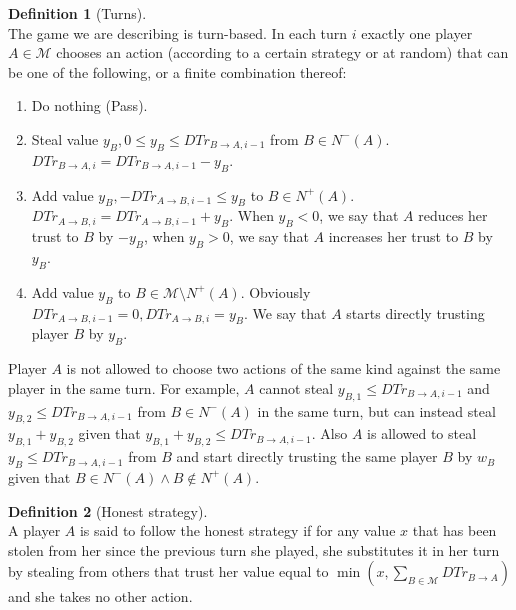 \documentclass[11pt]{article}
\theoremstyle{definition}
\newtheorem{definition}{Definition}[section]
\theoremstyle{corollary}
\begin{document}
      \begin{definition}[Turns] \ \\
         The game we are describing is turn-based. In each turn $i$ exactly one player $A \in \mathcal{M}$ chooses
         an action (according to a certain strategy or at random) that can be one of the following, or a finite
         combination thereof:
         \begin{enumerate}
            \item Do nothing (Pass).
            \item Steal value $y_B, 0 \leq y_B \leq DTr_{B \rightarrow A, i-1}$ from $B \in N^{-}(A)$.
            $DTr_{B \rightarrow A, i} = DTr_{B \rightarrow A, i-1} - y_B$.
            \item Add value $y_B, -DTr_{A \rightarrow B, i-1} \leq y_B$ to $B \in N^{+}(A)$.
            $DTr_{A \rightarrow B, i} = DTr_{A \rightarrow B, i-1} + y_B$. When $y_B < 0$, we say that $A$ reduces
            her trust to $B$ by $-y_B$, when $y_B > 0$, we say that $A$ increases her trust to $B$ by $y_B$.
            \item Add value $y_B$ to $B \in \mathcal{M} \setminus N^{+}(A)$.
            Obviously $DTr_{A \rightarrow B, i-1} = 0, DTr_{A \rightarrow B, i} = y_B$. We say that $A$ starts directly
            trusting player $B$ by $y_B$.
         \end{enumerate}
         Player $A$ is not allowed to choose two actions of the same kind against the same player in the same turn.
         For example, $A$ cannot steal $y_{B,1} \leq DTr_{B \rightarrow A, i-1}$ and
         $y_{B,2} \leq DTr_{B \rightarrow A, i-1}$ from $B \in N^{-}(A)$ in the same turn, but can instead steal
         $y_{B,1} + y_{B,2}$ given that $y_{B,1} + y_{B,2} \leq DTr_{B \rightarrow A, i-1}$. Also $A$ is allowed
         to steal $y_B \leq DTr_{B \rightarrow A, i-1}$ from $B$ and start directly trusting the same player $B$ by
         $w_B$ given that $B \in N^{-}(A) \wedge B \notin N^{+}(A)$.
      \end{definition}
      \begin{definition}[Honest strategy] \ \\
         A player $A$ is said to follow the honest strategy if for any value $x$ that has been stolen from her since
         the previous turn she played, she substitutes it in her turn by stealing from others that trust her value
         equal to $\min{(x,\sum\limits_{B \in \mathcal{M}}{DTr_{B \rightarrow A}})}$ and she takes no other action.
      \end{definition}
\end{document}
